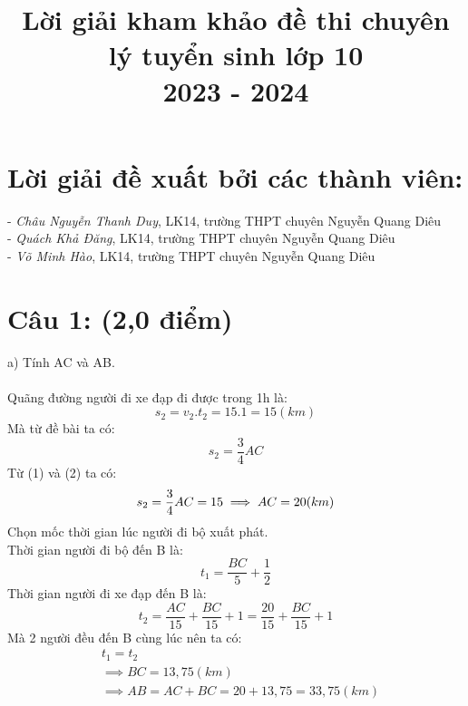 \documentclass[15pt]{article}
\title{Lời giải kham khảo đề thi chuyên lý tuyển sinh lớp 10\\ 2023 - 2024}
\begin{document}
\maketitle

\section*{Lời giải đề xuất bởi các thành viên:}
- \textit{Châu Nguyễn Thanh Duy}, LK14, trường THPT chuyên Nguyễn Quang Diêu\\
- \textit{Quách Khả Đăng}, LK14, trường THPT chuyên Nguyễn Quang Diêu\\
- \textit{Võ Minh Hào}, LK14, trường THPT chuyên Nguyễn Quang Diêu

\section*{Câu 1: (2,0 điểm)}
a) Tính AC và AB.\\
\\
Quãng đường người đi xe đạp đi được trong 1h là:\\
\begin{equation}
    s_{2} = v_{2}.t_{2} = 15.1 = 15 (km)
\end{equation}
Mà từ đề bài ta có:\\
\begin{equation}
    s_{2} = \frac{3}{4}AC
\end{equation}
Từ (1) và (2) ta có:
\begin{equation*}
    s_{2} = \frac{3}{4}AC = 15 \\
    \implies AC = 20 (km)
\end{equation*}
Chọn mốc thời gian lúc người đi bộ xuất phát.\\
Thời gian người đi bộ đến B là:
\begin{equation*}
    t_{1} = \frac{BC}{5} + \frac{1}{2}
\end{equation*}
Thời gian người đi xe đạp đến B là:
\begin{equation*}
    t_{2} = \frac{AC}{15} + \frac{BC}{15} + 1 = \frac{20}{15} + \frac{BC}{15} + 1
\end{equation*}
Mà 2 người đều đến B cùng lúc nên ta có: \\
\begin{equation*}
    \begin{aligned}
        & t_{1} = t_{2} \\
        & \implies BC = 13,75 (km) \\
        & \implies AB = AC + BC = 20 + 13,75 = 33,75 (km)
    \end{aligned}
\end{equation*}
\end{document}
